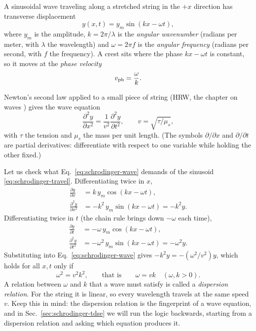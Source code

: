 A sinusoidal wave traveling along a stretched string in the $+x$ direction has transverse displacement
\begin{equation}
y(x,t)=y_m\sin(kx-\omega t),
\label{eq:schrodinger-travel}
\end{equation}
where $y_m$ is the amplitude, $k=2\pi/\lambda$ is the \emph{angular wavenumber} (radians per meter, with $\lambda$ the wavelength) and $\omega=2\pi f$ is the \emph{angular frequency} (radians per second, with $f$ the frequency). A crest sits where the phase $kx-\omega t$ is constant, so it moves at the \emph{phase velocity}
\begin{equation}
v_{\rm ph}=\frac{\omega}{k}.
\label{eq:schrodinger-vph}
\end{equation}

Newton's second law applied to a small piece of string (HRW, the chapter on waves \cite{hrw}) gives the wave equation
\begin{equation}
\frac{\partial^2 y}{\partial x^2}=\frac{1}{v^2}\frac{\partial^2 y}{\partial t^2},
\qquad v=\sqrt{\tau/\mu_s},
\label{eq:schrodinger-wave}
\end{equation}
with $\tau$ the tension and $\mu_s$ the mass per unit length. (The symbols $\partial/\partial x$ and $\partial/\partial t$ are partial derivatives: differentiate with respect to one variable while holding the other fixed.)

Let us check what Eq.~\eqref{eq:schrodinger-wave} demands of the sinusoid \eqref{eq:schrodinger-travel}. Differentiating twice in $x$,
\begin{align}
\frac{\partial y}{\partial x}&=k\,y_m\cos(kx-\omega t),\\
\frac{\partial^2 y}{\partial x^2}&=-k^2\,y_m\sin(kx-\omega t)=-k^2 y.
\end{align}
Differentiating twice in $t$ (the chain rule brings down $-\omega$ each time),
\begin{align}
\frac{\partial y}{\partial t}&=-\omega\,y_m\cos(kx-\omega t),\\
\frac{\partial^2 y}{\partial t^2}&=-\omega^2\,y_m\sin(kx-\omega t)=-\omega^2 y.
\end{align}
Substituting into Eq.~\eqref{eq:schrodinger-wave} gives $-k^2y=-(\omega^2/v^2)y$, which holds for all $x,t$ only if
\begin{equation}
\omega^2=v^2k^2,\qquad\text{that is}\qquad \omega=vk \quad(\omega,k>0).
\label{eq:schrodinger-dispersion-string}
\end{equation}
A relation between $\omega$ and $k$ that a wave must satisfy is called a \emph{dispersion relation}. For the string it is linear, so every wavelength travels at the same speed $v$. Keep this in mind: the dispersion relation is the fingerprint of a wave equation, and in Sec.~\ref{sec:schrodinger-tdse} we will run the logic backwards, starting from a dispersion relation and asking which equation produces it.

